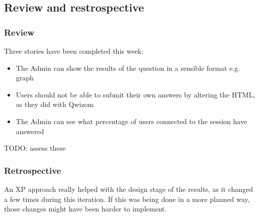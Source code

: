 \subsection{Review and restrospective}
\subsubsection{Review}
Three stories have been completed this week:
\begin{itemize}
	\item The Admin can show the results of the question in a sensible format e.g. graph
	\item Users should not be able to submit their own answers by altering the HTML, as they did with Qwizom
	\item The Admin can see what percentage of users connected to the session have answered
\end{itemize}
TODO: assess these

\subsubsection{Retrospective}
An XP approach really helped with the design stage of the results, as it changed a few times during this iteration. If this was being done in a more planned way, those changes might have been harder to implement.
\newpage
